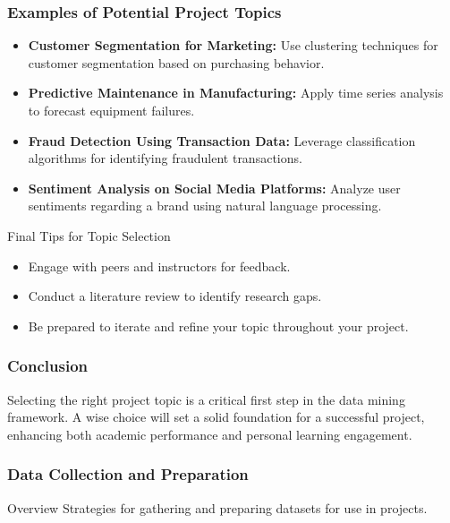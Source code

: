 \documentclass[aspectratio=169]{beamer}
\begin{document}
\begin{frame}[fragile]
  \frametitle{Examples of Potential Project Topics}
  
  \begin{itemize}
    \item \textbf{Customer Segmentation for Marketing:} 
      Use clustering techniques for customer segmentation based on purchasing behavior.

    \item \textbf{Predictive Maintenance in Manufacturing:} 
      Apply time series analysis to forecast equipment failures.

    \item \textbf{Fraud Detection Using Transaction Data:} 
      Leverage classification algorithms for identifying fraudulent transactions.

    \item \textbf{Sentiment Analysis on Social Media Platforms:} 
      Analyze user sentiments regarding a brand using natural language processing.
  \end{itemize}

  \begin{block}{Final Tips for Topic Selection}
    \begin{itemize}
      \item Engage with peers and instructors for feedback.
      \item Conduct a literature review to identify research gaps.
      \item Be prepared to iterate and refine your topic throughout your project.
    \end{itemize}
  \end{block}
\end{frame}

\begin{frame}[fragile]
  \frametitle{Conclusion}
  
  Selecting the right project topic is a critical first step in the data mining framework. A wise choice will set a solid foundation for a successful project, enhancing both academic performance and personal learning engagement.
\end{frame}

\begin{frame}[fragile]
  \frametitle{Data Collection and Preparation}
  \begin{block}{Overview}
    Strategies for gathering and preparing datasets for use in projects.
  \end{block}
\end{frame}
\end{document}
